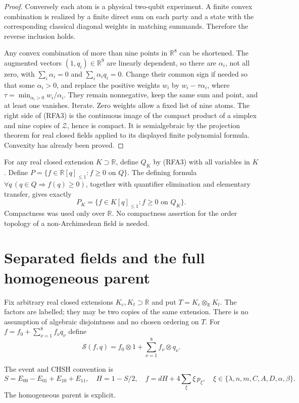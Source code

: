 \begin{proof}
Conversely each atom is a physical two-qubit experiment. A finite convex
combination is realized by a finite direct sum on each party and a state
with the corresponding classical diagonal weights in matching summands.
Therefore the reverse inclusion holds.

Any convex combination of more than nine points in $\mathbb R^8$ can be
shortened. The augmented vectors $(1,q_i)\in\mathbb R^9$ are linearly
dependent, so there are $\alpha_i$, not all zero, with
$\sum_i\alpha_i=0$ and $\sum_i\alpha_iq_i=0$. Change their common sign if
needed so that some $\alpha_i>0$, and replace the positive weights $w_i$
by $w_i-\tau\alpha_i$, where
$\tau=\min_{\alpha_i>0}w_i/\alpha_i$. They remain nonnegative, keep the
same sum and point, and at least one vanishes. Iterate. Zero weights
allow a fixed list of nine atoms. The right side of (RFA3) is the
continuous image of the compact product of a simplex and nine copies of
$\mathcal Z$, hence is compact. It is semialgebraic by the projection
theorem for real closed fields applied to its displayed finite polynomial
formula. Convexity has already been proved.
\end{proof}

For any real closed extension $K\supset\mathbb R$, define $Q_K$ by
(RFA3) with all variables in $K$. Define
$P=\{f\in\mathbb R[q]_{\leq1}:f\geq0\text{ on }Q\}$.
The defining formula
$\forall q\,(q\in Q\Rightarrow f(q)\geq0)$, together with quantifier
elimination and elementary transfer, gives exactly
\[
 P_K=\{f\in K[q]_{\leq1}:f\geq0\text{ on }Q_K\}.
 \tag{RFA6}
\]
Compactness was used only over $\mathbb R$. No compactness assertion for
the order topology of a non-Archimedean field is needed.

\section{Separated fields and the full homogeneous parent}

Fix arbitrary real closed extensions $K_c,K_t\supset\mathbb R$ and put
$T=K_c\otimes_{\mathbb R}K_t$. The factors are labelled; they may be two
copies of the same extension. There is no assumption of algebraic
disjointness and no chosen ordering on $T$. For
$f=f_0+\sum_{\nu=1}^8f_\nu q_\nu$ define
\[
 \mathscr S(f,q)=f_0\otimes1+\sum_{\nu=1}^8f_\nu\otimes q_\nu.
 \tag{RFA7}
\]

The event and CHSH convention is
\[
 S=E_{00}-E_{01}+E_{10}+E_{11},\quad H=1-S/2,\quad
 f=dH+4\sum_{\xi}\xi\,p_\xi,
 \quad \xi\in\{\lambda,n,m,C,A,D,\alpha,\beta\}.
 \tag{RFA8}
\]
The homogeneous parent is explicit.

